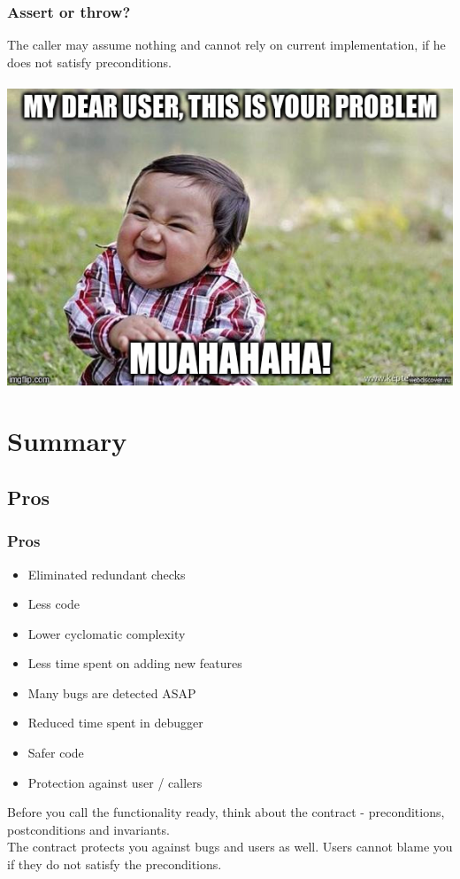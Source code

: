 \documentclass{beamer}
\begin{document}
\begin{frame}[fragile]
\frametitle{Assert or throw?}
\begin{center}
The caller may assume nothing and cannot rely on current implementation, if he does not satisfy preconditions. \\~\\
\includegraphics[scale=0.4]{evil_genius}
\end{center}
\end{frame}



\section{Summary}
\begin{frame}
\sectionpage
\end{frame}

\subsection{Pros}
\begin{frame}
\frametitle{Pros}
\begin{itemize}
  \item Eliminated redundant checks
  \item Less code
  \item Lower cyclomatic complexity
  \item Less time spent on adding new features
  \item Many bugs are detected ASAP
  \item Reduced time spent in debugger
  \item Safer code
  \item Protection against user / callers
\end{itemize}
Before you call the functionality ready, think about the contract - preconditions, postconditions and invariants. \\
The contract protects you against bugs and users as well. Users cannot blame you if they do not satisfy the preconditions.
\end{frame}
\end{document}
